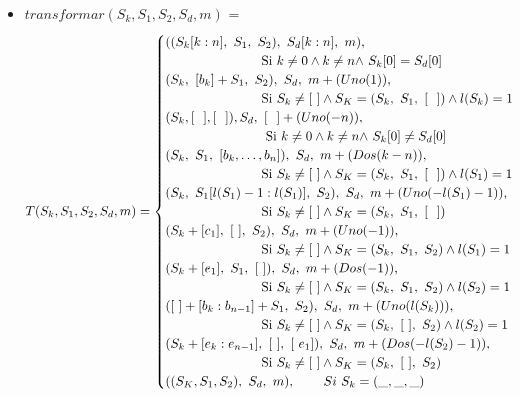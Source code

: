 \documentclass[12pt, a4paper]{article}
\begin{document}
\begin{itemize}
  \item $transformar(S_k, S_1, S_2, S_d, m)$ = \[   
    T(S_k, S_1, S_2, S_d, m) = 
    \begin{cases}
       \text{$((S_k[k:n],~S_1,~S_2),~S_d[k:n],~m )$,} \\ ~~~~~~~~~~~~~~~~~~~~~~ \text{Si $ k \neq 0 \land k \neq n \land~$$S_k[0] = S_d[0]$}\\
       \text{$(S_k,~[b_k] + S_1,~S_2), ~S_d,~m + (Uno(1))$,}  \\ ~~~~~~~~~~~~~~~~~~~~~~ \text{Si $S_k \neq [~] \land S_K = (S_k,~S_1,~[~~]) \land l(S_k) = 1$}\\
       \text{$(S_k, [~~], [~~]),  S_d,~[~~] + (Uno(-n))$,}  \\ ~~~~~~~~~~~~~~~~~~~~~~~ \text{Si $ k \neq 0 \land k \neq n \land~$$S_k[0] \neq S_d[0]$}\\
       \text{$(S_k,~S_1,~[b_k, \ldots, b_n]), ~S_d,~m + (Dos(k-n))$,}  \\ ~~~~~~~~~~~~~~~~~~~~~~ \text{Si $S_k \neq [~] \land S_K = (S_k,~S_1,~[~~]) \land l(S_1) = 1$}\\
       \text{$(S_k,~S_1[l(S_1)-1:l(S_1)],~S_2), ~S_d, ~m + (Uno(-l(S_1)-1))$,}  \\ ~~~~~~~~~~~~~~~~~~~~~~ \text{Si $S_k \neq [~] \land S_K = (S_k,~S_1,~[~~])$}\\
       \text{$(S_k + [c_1],~[~],~S_2), ~S_d, ~m + (Uno(-1))$,}  \\ ~~~~~~~~~~~~~~~~~~~~~~ \text{Si $S_k \neq [~] \land S_K = (S_k,~S_1,~S_2) \land l(S_1) = 1$}\\
       \text{$(S_k + [e_1],~S_1,~[~]), ~S_d, ~m + (Dos(-1))$,}  \\ ~~~~~~~~~~~~~~~~~~~~~~ \text{Si $S_k \neq [~] \land S_K = (S_k,~S_1,~S_2) \land l(S_2) = 1$}\\
       \text{$([~] + [b_k:b_{n-1}] + S_1,~S_2), ~S_d, ~m + (Uno(l(S_k)))$,}  \\ ~~~~~~~~~~~~~~~~~~~~~~ \text{Si $S_k \neq [~] \land S_K = (S_k,~[~],~S_2) \land l(S_2) = 1$}\\
       \text{$(S_k + [e_k:e_{n-1}],~[~],~[~e_1]), ~S_d, ~m + (Dos(-l(S_2)-1))$,}  \\ ~~~~~~~~~~~~~~~~~~~~~~ \text{Si $S_k \neq [~] \land S_K = (S_k,~[~],~S_2) $}\\
       \text{$((S_K, S_1, S_2), ~S_d, ~m )$,}~~~~~~~ \text{$ Si~S_k = (\_,\_,\_)$}\\
     \end{cases} \]
\end{itemize}
\end{document}
